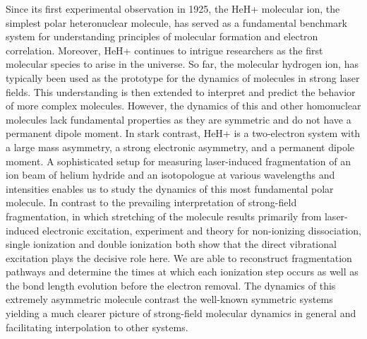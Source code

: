 Since its first experimental observation in 1925, the HeH+ molecular ion, the simplest polar heteronuclear molecule, has served as a fundamental benchmark system for understanding principles of molecular formation and electron correlation. Moreover, HeH+ continues to intrigue researchers as the first molecular species to arise in the universe.
So far, the molecular hydrogen ion, has typically been used as the prototype for the dynamics of molecules in strong laser fields. This understanding is then extended to interpret and predict the behavior of more complex molecules. However, the dynamics of this and other homonuclear molecules lack fundamental properties as they are symmetric and do not have a permanent dipole moment. In stark contrast, HeH+ is a two-electron system with a large mass asymmetry, a strong electronic asymmetry, and a permanent dipole moment.
A sophisticated setup for measuring laser-induced fragmentation of an ion beam of helium hydride and an isotopologue at various wavelengths and intensities enables us to study the dynamics of this most fundamental polar molecule. In contrast to the prevailing interpretation of strong-field fragmentation, in which stretching of the molecule results primarily from laser-induced electronic excitation, experiment and theory for non-ionizing dissociation, single ionization and double ionization both show that the direct vibrational excitation plays the decisive role here. We are able to reconstruct fragmentation pathways and determine the times at which each ionization step occurs as well as the bond length evolution before the electron removal. The dynamics of this extremely asymmetric molecule contrast the well-known symmetric systems yielding a much clearer picture of strong-field molecular dynamics in general and facilitating interpolation to other systems. 

\vspace{\baselineskip}